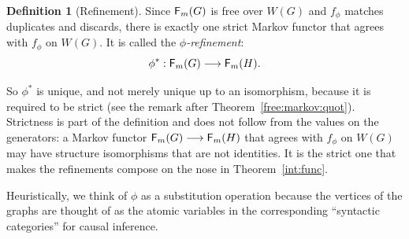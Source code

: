 \documentclass[12pt]{amsart}
\theoremstyle{plain}
\theoremstyle{definition}
\newtheorem{defn}[thm]{Definition}
\theoremstyle{remark}
\numberwithin{equation}{section}
\theoremstyle{plain}
\newcommand{\0}{\emptyset}
\newcommand{\fun}{\longrightarrow}
\newcommand{\cat}[1]{\textup{\textsf{#1}}}
\DeclareMathOperator{\cau}{\cat F_{\text{$m$}}}
\newcommand{\memph}[1]{{\color{magenta}\emph{#1}}}
\begin{document}
\begin{defn}[Refinement]\label{phi:inter}
Since $\cau(G)$ is free over $W(G)$ and $f_\phi$ matches duplicates and discards, there is exactly one strict Markov functor that agrees with $f_\phi$ on $W(G)$. It is called the \memph{$\phi$-refinement}:
\[
\phi^* : \cau(G) \fun \cau(H).
\]

\end{defn}

So $\phi^*$ is unique, and not merely unique up to an isomorphism, because it is required to be strict (see the remark after Theorem~\ref{free:markov:quot}). Strictness is part of the definition and does not follow from the values on the generators: a Markov functor $\cau(G) \fun \cau(H)$ that agrees with $f_\phi$ on $W(G)$ may have structure isomorphisms that are not identities. It is the strict one that makes the refinements compose on the nose in Theorem~\ref{int:func}.

Heuristically, we think of $\phi$ as a substitution operation because the vertices of the graphs are thought of as the atomic variables in the corresponding ``syntactic categories'' for causal inference.
\end{document}
